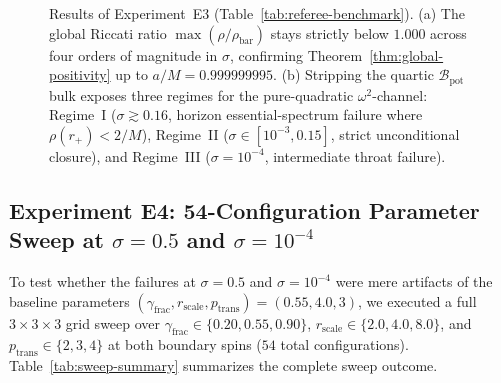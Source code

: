 \documentclass[11pt, a4paper]{article}
\theoremstyle{remark}
\begin{document}
\begin{figure}[h]
\caption{Results of Experiment~E3 (Table~\ref{tab:referee-benchmark}). (a) The global Riccati ratio $\max(\rho/\rho_{\mathrm{bar}})$ stays strictly below $1.000$ across four orders of magnitude in $\sigma$, confirming Theorem~\ref{thm:global-positivity} up to $a/M = 0.999999995$. (b) Stripping the quartic $\mathcal{B}_{\mathrm{pot}}$ bulk exposes three regimes for the pure-quadratic $\omega^2$-channel: Regime~I ($\sigma \gtrsim 0.16$, horizon essential-spectrum failure where $\rho(r_+) < 2/M$), Regime~II ($\sigma \in [10^{-3}, 0.15]$, strict unconditional closure), and Regime~III ($\sigma = 10^{-4}$, intermediate throat failure).}
\label{fig:riccati-gap2a}
\end{figure}

\subsection{Experiment E4: 54-Configuration Parameter Sweep at $\sigma = 0.5$ and $\sigma = 10^{-4}$}

To test whether the failures at $\sigma = 0.5$ and $\sigma = 10^{-4}$ were mere artifacts of the baseline parameters $(\gamma_{\mathrm{frac}}, r_{\mathrm{scale}}, p_{\mathrm{trans}}) = (0.55, 4.0, 3)$, we executed a full $3 \times 3 \times 3$ grid sweep over $\gamma_{\mathrm{frac}} \in \{0.20, 0.55, 0.90\}$, $r_{\mathrm{scale}} \in \{2.0, 4.0, 8.0\}$, and $p_{\mathrm{trans}} \in \{2, 3, 4\}$ at both boundary spins ($54$ total configurations). Table~\ref{tab:sweep-summary} summarizes the complete sweep outcome.
\end{document}
